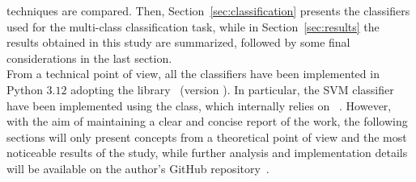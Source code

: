 \documentclass[../main.tex]{subfiles}
\begin{document}
techniques are compared.
Then, Section~\ref{sec:classification} presents the classifiers used for the
multi-class classification task, while in Section~\ref{sec:results} the results
obtained in this study are summarized, followed by some final considerations in
the last section.\\
From a technical point of view, all the classifiers have been implemented in
Python $3.12$ adopting the  library~\cite{scikit-learn}
(version ). In particular, the SVM classifier have been implemented 
using the  class, which internally relies on
~\cite{libsvm}. 
However, with the aim of maintaining a clear and concise report of the work, the
following sections will only present concepts from a theoretical point of view
and the most noticeable results of the study,
while further analysis and implementation details will be available
on the author's GitHub repository~\cite{github}.
\end{document}
